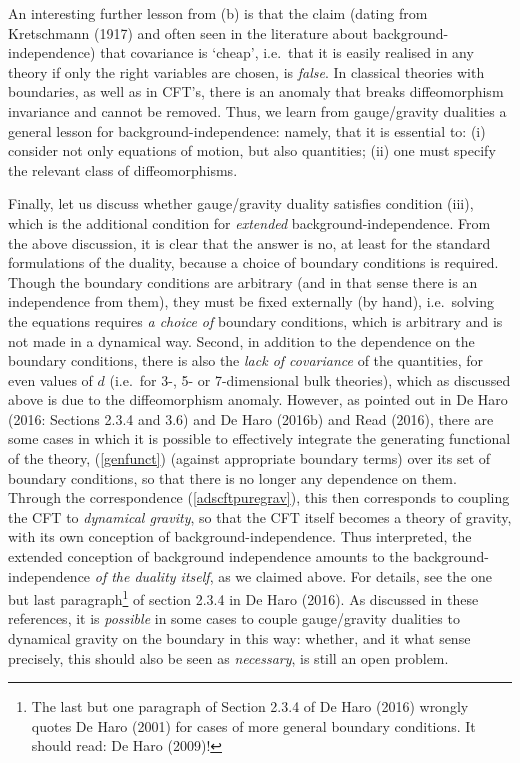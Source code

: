 \documentclass[12pt]{article}
\renewcommand{\^}[1]{\hat{#1}}
\newcommand{\eq}[1]{(\ref{#1})}
\begin{document}
An interesting further lesson from (b) is that the claim (dating from Kretschmann (1917) and often seen in the literature about background-independence) that covariance is `cheap', i.e.~that it is easily realised in any theory if only the right variables are chosen, is {\it false}. In classical theories with boundaries, as well as in CFT's, there is an anomaly that breaks diffeomorphism invariance and cannot be removed. Thus, we learn from gauge/gravity dualities a general lesson for background-independence: namely, that it is essential to: (i) consider not only equations of motion, but also quantities; (ii) one must specify the relevant class of diffeomorphisms.

Finally, let us discuss whether gauge/gravity duality satisfies condition (iii), which is the additional condition for {\it extended} background-independence. From the above discussion, it is clear that the answer is no, at least for the standard formulations of the duality, because a choice of boundary conditions is required. Though the boundary conditions are arbitrary (and in that sense there is an independence from them), they must be fixed externally (by hand), i.e.~solving the equations requires {\it a choice of} boundary conditions, which is arbitrary and is not made in a dynamical way. Second, in addition to the dependence on the boundary conditions, there is also the {\it lack of covariance} of the quantities, for even values of $d$ (i.e.~for 3-, 5- or 7-dimensional bulk theories), which as discussed above is due to the diffeomorphism anomaly. However, as pointed out in De Haro (2016: Sections 2.3.4 and 3.6) and De Haro (2016b) and Read (2016), there are some cases in which it is possible to effectively integrate the generating functional of the theory, \eq{genfunct} (against appropriate boundary terms) over its set of boundary conditions, so that there is no longer any dependence on them. Through the correspondence \eq{adscftpuregrav}, this then corresponds to coupling the CFT to {\it dynamical gravity}, so that the CFT itself becomes a theory of gravity, with its own conception of background-independence. Thus interpreted, the extended conception of background independence amounts to the background-independence {\it of the duality itself}, as we claimed above. For details, see the one but last paragraph\footnote{The last but one paragraph of Section 2.3.4 of De Haro (2016) wrongly quotes De Haro (2001) for cases of more general boundary conditions. It should read: De Haro (2009)!} of section 2.3.4 in De Haro (2016). As discussed in these references, it is {\it possible} in some cases to couple gauge/gravity dualities to dynamical gravity on the boundary in this way: whether, and it what sense precisely, this should also be seen as {\it necessary}, is still an open problem.
\end{document}
